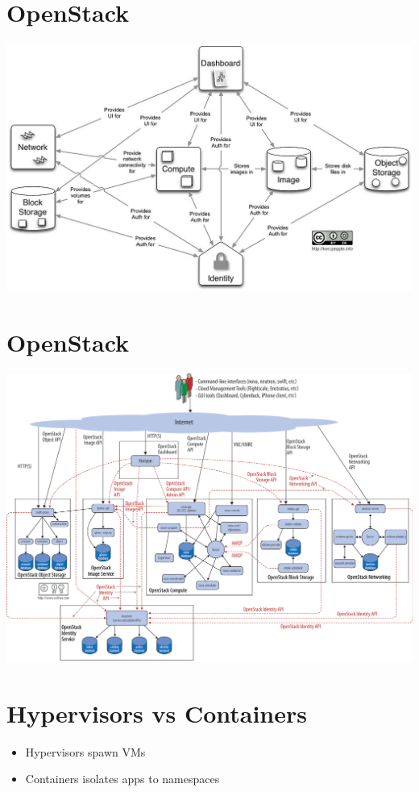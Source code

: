 \documentclass[11pt]{article}
\begin{document}
\section*{OpenStack}
\label{sec:orgad024a2}
\begin{center}
\includegraphics[width=.9\linewidth]{./openstack.jpg}
\end{center}

\section*{OpenStack}
\label{sec:org6683d3e}
\begin{center}
\includegraphics[width=.9\linewidth]{./openstack-detailed.png}
\end{center}

\section*{Hypervisors vs Containers}
\label{sec:org8944238}
\begin{itemize}
\item Hypervisors spawn VMs
\item Containers isolates apps to namespaces
\end{itemize}
\end{document}
